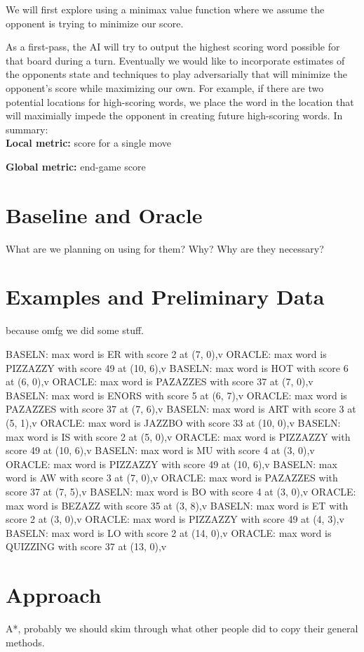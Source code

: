 \documentclass[12pt]{article}
\begin{document}
We will first explore using a minimax value function where we assume
the opponent is trying to minimize our score.

As a first-pass, the AI will try to output the highest scoring word
possible for that board during a turn.  Eventually we would like to
incorporate estimates of the opponents state and techniques to play
adversarially that will minimize the opponent's score while maximizing
our own. For example, if there are two potential locations for
high-scoring words, we place the word in the location that will
maximially impede the opponent in creating future high-scoring
words. In summary:\\

\textbf{Local metric:} score for a single move

\textbf{Global metric:} end-game score

\section*{Baseline and Oracle}
What are we planning on using for them? Why? Why are they necessary?

\section*{Examples and Preliminary Data}
because omfg we did some stuff.

BASELN: max word is ER with score 2 at (7, 0),v
ORACLE: max word is PIZZAZZY with score 49 at (10, 6),v
BASELN: max word is HOT with score 6 at (6, 0),v
ORACLE: max word is PAZAZZES with score 37 at (7, 0),v
BASELN: max word is ENORS with score 5 at (6, 7),v
ORACLE: max word is PAZAZZES with score 37 at (7, 6),v
BASELN: max word is ART with score 3 at (5, 1),v
ORACLE: max word is JAZZBO with score 33 at (10, 0),v
BASELN: max word is IS with score 2 at (5, 0),v
ORACLE: max word is PIZZAZZY with score 49 at (10, 6),v
BASELN: max word is MU with score 4 at (3, 0),v
ORACLE: max word is PIZZAZZY with score 49 at (10, 6),v
BASELN: max word is AW with score 3 at (7, 0),v
ORACLE: max word is PAZAZZES with score 37 at (7, 5),v
BASELN: max word is BO with score 4 at (3, 0),v
ORACLE: max word is BEZAZZ with score 35 at (3, 8),v
BASELN: max word is ET with score 2 at (3, 0),v
ORACLE: max word is PIZZAZZY with score 49 at (4, 3),v
BASELN: max word is LO with score 2 at (14, 0),v
ORACLE: max word is QUIZZING with score 37 at (13, 0),v

\section*{Approach}
A*, probably we should skim through what other people did to copy their general methods.
\end{document}
